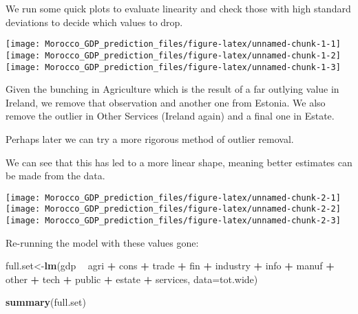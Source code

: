 \documentclass[
]{article}
\newenvironment{Shaded}{\begin{snugshade}}{\end{snugshade}}
\newcommand{\DataTypeTok}[1]{\textcolor[rgb]{0.13,0.29,0.53}{#1}}
\newcommand{\KeywordTok}[1]{\textcolor[rgb]{0.13,0.29,0.53}{\textbf{#1}}}
\newcommand{\NormalTok}[1]{#1}
\newcommand{\OperatorTok}[1]{\textcolor[rgb]{0.81,0.36,0.00}{\textbf{#1}}}
\newcommand{\StringTok}[1]{\textcolor[rgb]{0.31,0.60,0.02}{#1}}
\begin{document}
We run some quick plots to evaluate linearity and check those with high
standard deviations to decide which values to drop.

\texttt{[image: Morocco\_GDP\_prediction\_files/figure-latex/unnamed-chunk-1-1]}
\texttt{[image: Morocco\_GDP\_prediction\_files/figure-latex/unnamed-chunk-1-2]}
\texttt{[image: Morocco\_GDP\_prediction\_files/figure-latex/unnamed-chunk-1-3]}

Given the bunching in Agriculture which is the result of a far outlying
value in Ireland, we remove that observation and another one from
Estonia. We also remove the outlier in Other Services (Ireland again)
and a final one in Estate.

Perhaps later we can try a more rigorous method of outlier removal.

We can see that this has led to a more linear shape, meaning better
estimates can be made from the data.

\texttt{[image: Morocco\_GDP\_prediction\_files/figure-latex/unnamed-chunk-2-1]}
\texttt{[image: Morocco\_GDP\_prediction\_files/figure-latex/unnamed-chunk-2-2]}
\texttt{[image: Morocco\_GDP\_prediction\_files/figure-latex/unnamed-chunk-2-3]}

Re-running the model with these values gone:

\begin{Shaded}
\begin{Highlighting}[]
\NormalTok{full.set<-}\KeywordTok{lm}\NormalTok{(gdp }\OperatorTok{~}\StringTok{ }\NormalTok{agri }\OperatorTok{+}\StringTok{ }\NormalTok{cons }\OperatorTok{+}\StringTok{ }\NormalTok{trade }\OperatorTok{+}\StringTok{ }\NormalTok{fin }\OperatorTok{+}\StringTok{ }\NormalTok{industry }\OperatorTok{+}\StringTok{ }\NormalTok{info }\OperatorTok{+}\StringTok{ }\NormalTok{manuf }\OperatorTok{+}\StringTok{ }\NormalTok{other }\OperatorTok{+}\StringTok{ }\NormalTok{tech }\OperatorTok{+}\StringTok{ }\NormalTok{public }\OperatorTok{+}\StringTok{ }\NormalTok{estate }\OperatorTok{+}\StringTok{ }\NormalTok{services, }\DataTypeTok{data=}\NormalTok{tot.wide)}

\KeywordTok{summary}\NormalTok{(full.set)}
\end{Highlighting}
\end{Shaded}
\end{document}
